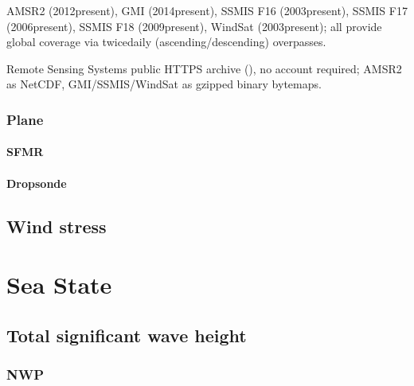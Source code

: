 \documentclass[a4paper,10pt,english]{sphinxmanual}
\begin{document}
\sphinxAtStartPar
{}

\sphinxAtStartPar
AMSR2 (2012\sphinxhyphen{}present), GMI (2014\sphinxhyphen{}present), SSMIS F16 (2003\sphinxhyphen{}present), SSMIS F17 (2006\sphinxhyphen{}present), SSMIS F18 (2009\sphinxhyphen{}present), WindSat (2003\sphinxhyphen{}present); all provide global coverage via twice\sphinxhyphen{}daily (ascending/descending) overpasses.

\sphinxAtStartPar
{}

\sphinxAtStartPar
Remote Sensing Systems public HTTPS archive (), no account required; AMSR2 as NetCDF, GMI/SSMIS/WindSat as gzipped binary bytemaps.


\subsubsection{Plane}
\label{\detokenize{05_reference_datasets:plane}}

\paragraph{SFMR}
\label{\detokenize{05_reference_datasets:sfmr}}

\paragraph{Dropsonde}
\label{\detokenize{05_reference_datasets:dropsonde}}

\subsection{Wind stress}
\label{\detokenize{05_reference_datasets:wind-stress}}

\section{Sea State}
\label{\detokenize{05_reference_datasets:sea-state}}

\subsection{Total significant wave height}
\label{\detokenize{05_reference_datasets:total-significant-wave-height}}

\subsubsection{NWP}
\label{\detokenize{05_reference_datasets:nwp}}
\end{document}
